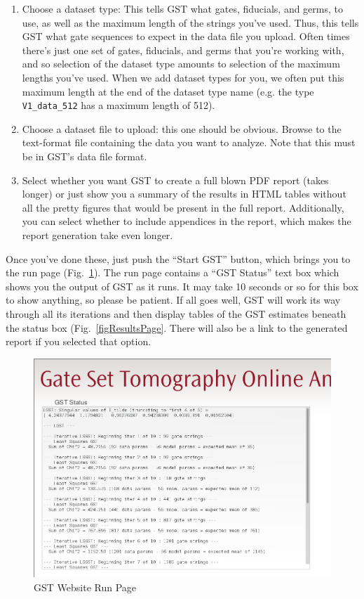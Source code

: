 \documentclass{article}[11pt]
\begin{document}
\begin{enumerate}
\item Choose a dataset type: This tells GST what gates, fiducials, and germs, to use, as well as the maximum length of the strings you've used.  Thus, this tells GST what gate sequences to expect in the data file you upload.  Often times there's just one set of gates, fiducials, and germs that you're working with, and so selection of the dataset type amounts to selection of the maximum lengths you've used.  When we add dataset types for you, we often put this maximum length at the end of the dataset type name (e.g. the type \texttt{V1\_data\_512} has a maximum length of 512).
\item Choose a dataset file to upload: this one should be obvious.  Browse to the text-format file containing the data you want to analyze.  Note that this must be in GST's data file format.
\item Select whether you want GST to create a full blown PDF report (takes longer) or just show you a summary of the results in HTML tables without all the pretty figures that would be present in the full report.  Additionally, you can select whether to include appendices in the report, which makes the report generation take even longer.
\end{enumerate}

Once you've done these, just push the ``Start GST'' button, which brings you to the run page (Fig.~\ref{figRunPage}).  The run page contains a ``GST Status'' text box which shows you the output of GST as it runs.  It may take 10 seconds or so for this box to show anything, so please be patient.  If all goes well, GST will work its way through all its iterations and then display tables of the GST estimates beneath the status box (Fig.~\ref{figResultsPage}.  There will also be a link to the generated report if you selected that option.  

\begin{figure}
\begin{center}
\includegraphics[width=6in]{QuickStartResources/StatusPage.jpg}
\caption{GST Website Run Page\label{figRunPage}}
\end{center}
\end{figure}
\end{document}
